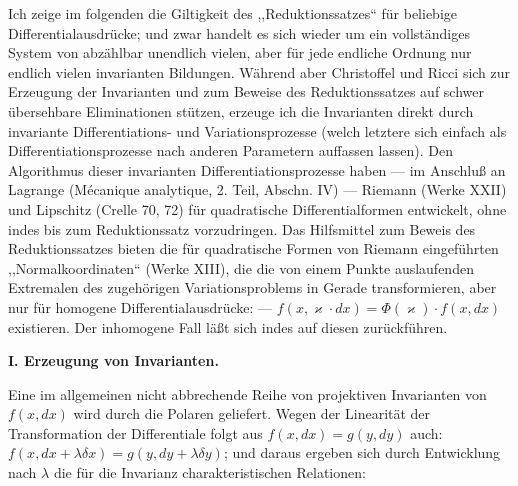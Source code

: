 Ich zeige im folgenden die Giltigkeit des ,,Reduktionssatzes`` für
beliebige Differentialausdrücke; und zwar handelt es sich wieder um
ein vollständiges System von abzählbar unendlich vielen, aber für jede
endliche Ordnung nur endlich vielen invarianten Bildungen. Während
aber Christoffel und Ricci sich zur Erzeugung der Invarianten und zum
Beweise des Reduktionssatzes auf schwer übersehbare Eliminationen
stützen, erzeuge ich die Invarianten direkt durch invariante
Differentiations- und Variationsprozesse (welch letztere sich einfach
als Differentiationsprozesse nach anderen Parametern auffassen lassen).
Den Algorithmus dieser invarianten Differentiationsprozesse haben ---
im Anschluß an Lagrange (Mécanique analytique, 2. Teil, Abschn. IV)
--- Riemann (Werke XXII) und Lipschitz (Crelle 70, 72) für
quadratische Differentialformen entwickelt, ohne indes bis zum
Reduktionssatz vorzudringen. Das Hilfsmittel zum Beweis des
Reduktionssatzes bieten die für quadratische Formen von Riemann
eingeführten ,,Normalkoordinaten`` (Werke XIII), die die von einem
Punkte auslaufenden Extremalen des zugehörigen Variationsproblems in
Gerade transformieren, aber nur für homogene Differentialausdrücke:
--- \(f(x,\varkappa\cdot dx)=\Phi(\varkappa)\cdot f(x,dx)\) existieren. Der
inhomogene Fall läßt sich indes auf diesen zurückführen.

\begin{center}
\textbf{I. Erzeugung von Invarianten.}
\end{center}

Eine im allgemeinen nicht abbrechende Reihe von projektiven Invarianten
von \(f(x,dx)\) wird durch die Polaren geliefert. Wegen der Linearität
der Transformation der Differentiale folgt aus
\(f(x,dx)=g(y,dy)\) auch:
\(f(x,dx+\lambda\delta x)=g(y,dy+\lambda\delta y)\); und daraus ergeben
sich durch Entwicklung nach \(\lambda\) die für die Invarianz
charakteristischen Relationen:

